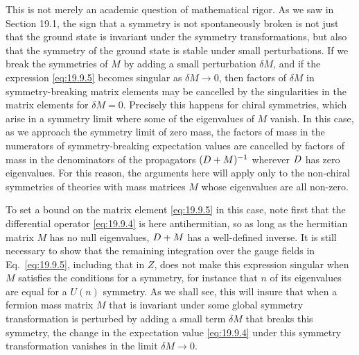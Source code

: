 This is not merely an academic question of mathematical rigor. As we saw in Section 19.1, the sign that a symmetry is not spontaneously broken is not just that the ground state is invariant under the symmetry transformations, but also that the symmetry of the ground state is stable under small perturbations. If we break the symmetries of $M$ by adding a small perturbation $\delta M$, and if the expression \eqref{eq:19.9.5} becomes singular as $\delta M\to0$, then factors of $\delta M$ in symmetry-breaking matrix elements may be cancelled by the singularities in the matrix elements for $\delta M=0$. Precisely this happens for chiral symmetries, which arise in a symmetry limit where some of the eigenvalues of $M$ vanish. In this case, as we approach the symmetry limit of zero mass, the factors of mass in the numerators of symmetry-breaking expectation values are cancelled by factors of mass in the denominators of the propagators $(\sl{D}+M)^{-1}$ wherever $\sl{D}$ has zero eigenvalues. For this reason, the arguments here will apply only to the non-chiral symmetries of theories with mass matrices $M$ whose eigenvalues are all non-zero.

To set a bound on the matrix element \eqref{eq:19.9.5} in this case, note first that the differential operator \eqref{eq:19.9.4} is here antihermitian, so as long as the hermitian matrix $M$ has no null eigenvalues, $\sl{D}+M$ has a well-defined inverse. It is still necessary to show that the remaining integration over the gauge fields in Eq.~\eqref{eq:19.9.5}, including that in $Z$, does not make this expression singular when $M$ satisfies the conditions for a symmetry, for instance that $n$ of its eigenvalues are equal for a $U(n)$ symmetry. As we shall see, this will insure that when a fermion mass matrix $M$ that is invariant under some global symmetry transformation is perturbed by adding a small term $\delta M$ that breaks this symmetry, the change in the expectation value \eqref{eq:19.9.4} under this symmetry transformation vanishes in the limit $\delta M\to0$.

